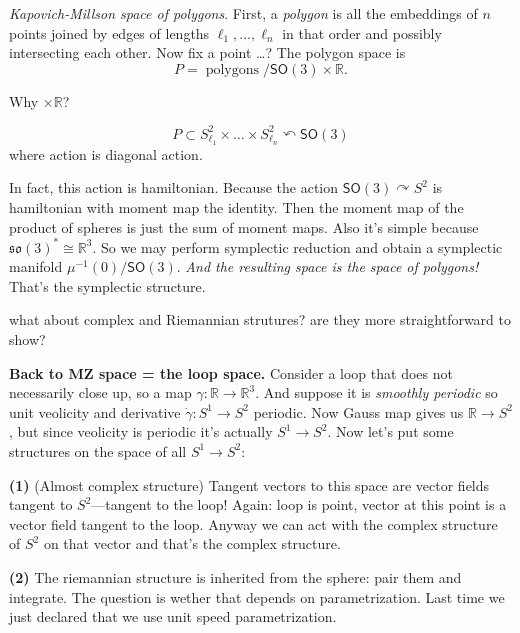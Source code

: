 \begin{definition}
\label{definition-korshunov-kapovich-millson}
\textit{Kapovich-Millson space of polygons}.
First, a \textit{polygon} is all the
embeddings of $n$ points joined by edges of
lengths $\ell_1,\ldots,\ell_n$ in that order
and possibly intersecting each other. Now fix
a point …? The polygon space is
$$P=\operatorname{polygons}\Big/
\mathsf{SO}(3)\times
\mathbb{R} .$$
\end{definition}

\begin{remark}[Question]
\label{remark-korshunov-question-r}
Why $\times\mathbb{R}$?
\end{remark}

$$P\subset S^2_{\ell_1}\times\ldots\times
S^2_{\ell_n}\curvearrowleft \mathsf{SO}(3)$$
where action is diagonal action.

In fact, this action is hamiltonian. Because
the action $\mathsf{SO}(3)\curvearrowright
S^2$ is hamiltonian with moment map the
identity. Then the moment map of the product
of spheres is just the sum of moment maps.
Also it's simple because
$\mathfrak{so}(3)^*\cong \mathbb{R}^3$. So we
may perform symplectic reduction and obtain a
symplectic manifold
$\mu^{-1}(0)/\mathsf{SO}(3)$. \textit{And the
resulting space is the space of polygons!}
That's the symplectic structure.

\begin{remark}[Question]
\label{remark-korshunov-question-structures}
what about complex and Riemannian strutures?
are they more straightforward to show?
\end{remark}

\medskip\noindent
{\bf Back to MZ space = the loop space.}
Consider a loop that does not necessarily
close up, so a map $\gamma:\mathbb{R} \to
\mathbb{R}^3$. And suppose it is
\textit{smoothly periodic} so unit veolicity
and derivative $\dot\gamma:S^1\to S^2$
periodic. Now Gauss map gives us
$\mathbb{R}\to S^2$, but since veolicity is
periodic it's actually $S^1 \to S^2$. Now
let's put some structures on the space of all
$S^1 \to S^2$:

{\bf (1)}
(Almost complex structure) Tangent vectors to
this space are vector fields tangent to
$S^2$---tangent to the loop! Again: loop is
point, vector at this point is a vector field
tangent to the loop. Anyway we can act with
the complex structure of $S^2$ on that vector
and that's the complex structure.

{\bf (2)}
The riemannian structure is inherited from
the sphere: pair them and integrate. The
question is wether that depends on
parametrization. Last time we just declared
that we use unit speed parametrization.

